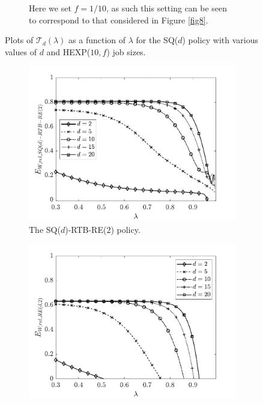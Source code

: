\documentclass[12pt]{report}
\begin{document}
\begin{figure}[t]
\begin{center}
\begin{subfigure}{.43\textwidth}
\caption{Here we set $f=1/10$, as such this setting can be seen to correspond to that considered in Figure \ref{fig8}.}
\label{fig6b}
\end{subfigure}
\caption{Plots of $\mathcal{T}_d(\lambda)$ as a function of $\lambda$ for the SQ($d$) policy with various values of $d$ and HEXP($10, f$) job sizes.}
\label{fig6}
\end{center}
\end{figure}


\begin{figure}[t]
\begin{center}
\begin{subfigure}{0.43\textwidth}
\centering
\captionsetup{width=.8\linewidth}
\includegraphics[width=1\linewidth]{figures/Chapter7/fig5a.pdf}
\caption{The SQ($d$)-RTB-RE($2$) policy.}
\label{fig7a}
\end{subfigure}
\begin{subfigure}{.43\textwidth}
\centering
\captionsetup{width=.8\linewidth}
\includegraphics[width=1\linewidth]{figures/Chapter7/fig5b.pdf}

\end{subfigure}
\end{center}
\end{figure}
\end{document}
